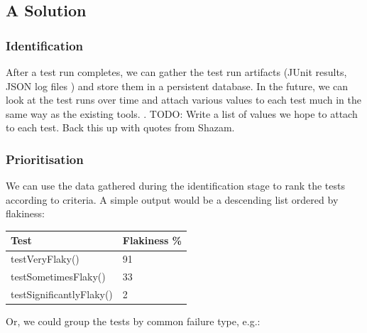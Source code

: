 \subsection{A Solution}

\subsubsection{Identification}

After a test run completes, we can gather the test run artifacts (JUnit results, \heisentest{} JSON log files \etc) and store them in a persistent database. In the future, we can look at the test runs over time and attach various values to each test much in the same way as the existing tools. .
TODO: Write a list of values we hope to attach to each test. Back this up with quotes from Shazam.

\subsubsection{Prioritisation}

We can use the data gathered during the identification stage to rank the tests according to criteria. A simple output would be a descending list ordered by flakiness:

\begin{center}
    \begin{tabular}{ | l | p{5cm} |}
    \hline
    Test & Flakiness \% \\ \hline
    testVeryFlaky() & 91 \\ \hline
    testSometimesFlaky() & 33 \\ \hline
    testSignificantlyFlaky() & 2 \\ \hline
    \end{tabular}
\end{center}

Or, we could group the tests by common failure type, e.g.:


